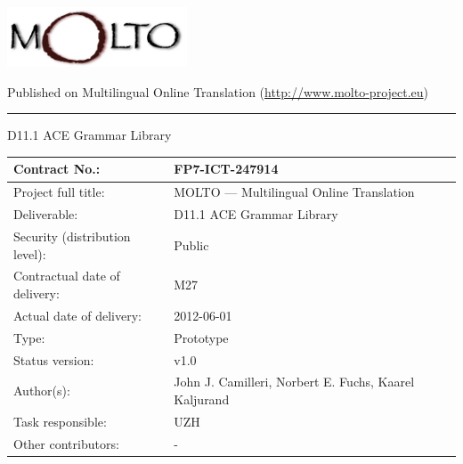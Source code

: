 \thispagestyle{empty}

\begin{minipage}{0.99\textwidth}
\begin{flushleft}
\includegraphics[width=0.4\textwidth]{molto_logo}

{\normalsize Published on Multilingual Online Translation (\url{http://www.molto-project.eu})}
\end{flushleft}
\end{minipage}

\rule[15pt]{0.9\textwidth}{0.5pt}

{\LARGE D11.1 ACE Grammar Library}

\begin{center}
\begin{tabular}{ | l | l | }
\hline
Contract No.: & FP7-ICT-247914 \\
\hline
Project full title: & MOLTO --- Multilingual Online Translation \\
\hline
Deliverable: & D11.1 ACE Grammar Library \\
\hline
Security (distribution level): & Public \\
\hline
Contractual date of delivery: & M27 \\
\hline
Actual date of delivery: & 2012-06-01 \\
\hline
Type: & Prototype \\
\hline
Status version: & v1.0 \\
\hline
Author(s): & John J. Camilleri, Norbert E. Fuchs, Kaarel Kaljurand \\
\hline
Task responsible: & UZH \\
\hline
Other contributors: & -\\
\hline
\end{tabular}
\end{center}
